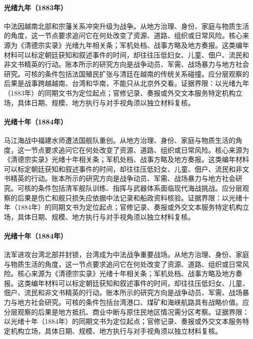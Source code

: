 \hypertarget{social:EQ-1883-SINO-FRENCH-WAR-BEGIN}{}\paragraph{光绪九年（1883年）}中法因越南北部和宗藩关系冲突升级为战争。从地方治理、身份、家庭与物质生活的角度，这一节点要求追问它在何处改变了资源、道路、组织或日常风险。核心来源为《清德宗实录》光绪九年相关条；军机处档、战事方略及地方奏报。这类编年材料可以标定朝廷获知和叙述事件的时间，却往往压低妇女、儿童、佃户、流民和非文书精英的行动。账本所示的研究方向是战争动员、军需、战场暴力与地方社会研究。可核的条件包括法国殖民扩张与清廷在越南的传统关系碰撞。应分层观察的后果是战事跨越越南、台湾和华南，不能只从北京外交看。证据界限：以光绪九年（1883年）的同期文书为定位起点；官修记录、奏报或外交文本服务特定机构立场，具体日期、规模、地方执行与对手视角须以独立材料复核。
\hypertarget{social:EQ-1884-FUZHOU-NAVAL-BATTLE}{}\paragraph{光绪十年（1884年）}马江海战中福建水师遭法国舰队重创。从地方治理、身份、家庭与物质生活的角度，这一节点要求追问它在何处改变了资源、道路、组织或日常风险。核心来源为《清德宗实录》光绪十年相关条；军机处档、战事方略及地方奏报。这类编年材料可以标定朝廷获知和叙述事件的时间，却往往压低妇女、儿童、佃户、流民和非文书精英的行动。账本所示的研究方向是战争动员、军需、战场暴力与地方社会研究。可核的条件包括清军舰队训练、指挥与武器体系面临现代海战挑战。应分层观察的后果是伤亡和舰只损失应依据中法记录和船政资料核验。证据界限：以光绪十年（1884年）的同期文书为定位起点；官修记录、奏报或外交文本服务特定机构立场，具体日期、规模、地方执行与对手视角须以独立材料复核。
\hypertarget{social:EQ-1884-TAIWAN-BLOCKADE}{}\paragraph{光绪十年（1884年）}法军进攻台湾北部并封锁，台湾成为中法战争重要战场。从地方治理、身份、家庭与物质生活的角度，这一节点要求追问它在何处改变了资源、道路、组织或日常风险。核心来源为《清德宗实录》光绪十年相关条；军机处档、战事方略及地方奏报。这类编年材料可以标定朝廷获知和叙述事件的时间，却往往压低妇女、儿童、佃户、流民和非文书精英的行动。账本所示的研究方向是战争动员、军需、战场暴力与地方社会研究。可核的条件包括台湾港口、煤矿和海峡航路具有战略价值。应分层观察的后果是地方抵抗、商业中断与原住民地区情况需分区考察。证据界限：以光绪十年（1884年）的同期文书为定位起点；官修记录、奏报或外交文本服务特定机构立场，具体日期、规模、地方执行与对手视角须以独立材料复核。
